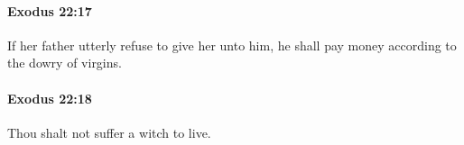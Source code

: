 		\paragraph{Exodus 22:17} %
			\label{EXODUS-22-17}

			If her father utterly refuse to give her unto him, he shall pay money according to the dowry of virgins.


		\paragraph{Exodus 22:18} %
			\label{EXODUS-22-18}

			Thou shalt not suffer a witch to live.


